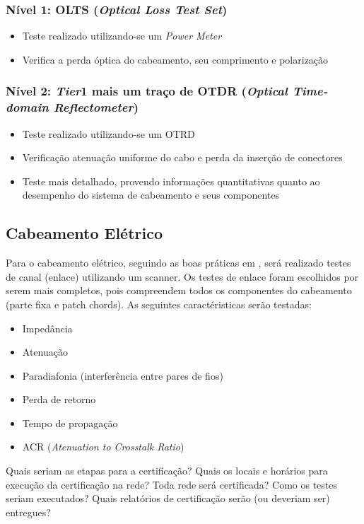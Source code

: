 \documentclass[	DIV=calc,%
							paper=a4,%
							fontsize=12pt,%
							onecolumn]{scrartcl}	 					%
\begin{document}
\subsubsection{Nível 1: OLTS (\textit{Optical Loss Test Set})}
\begin{itemize}
	\item Teste realizado utilizando-se um \textit{Power Meter}
	\item Verifica a perda óptica do cabeamento, seu comprimento e polarização
\end{itemize}

\subsubsection{Nível 2: \textit{Tier}1 mais um traço de OTDR (\textit{Optical Time-domain Reflectometer})}
\begin{itemize}
	\item Teste realizado utilizando-se um OTRD
	\item Verificação atenuação uniforme do cabo e perda da inserção de conectores
	\item Teste mais detalhado, provendo informações quantitativas quanto ao desempenho do sistema de cabeamento e seus componentes
\end{itemize}

\subsection{Cabeamento Elétrico}
Para o cabeamento elétrico, seguindo as boas práticas em \cite{ref6}, será realizado testes de canal (enlace) utilizando um scanner.
Os testes de enlace foram escolhidos por serem mais completos, pois compreendem todos os componentes do cabeamento (parte fixa e patch chords).
As seguintes caractéristicas serão testadas:
\begin{itemize}
	\item Impedância
	\item Atenuação
	\item Paradiafonia (interferência entre pares de fios)
	\item Perda de retorno
	\item Tempo de propagação
	\item ACR (\textit{Atenuation to Crosstalk Ratio})
\end{itemize}

Quais seriam as etapas para a certificação? 
Quais os locais e horários para execução da certificação na rede? Toda rede será certificada?
Como os testes seriam executados?
Quais relatórios de certificação serão (ou deveriam ser) entregues? 
\end{document}
